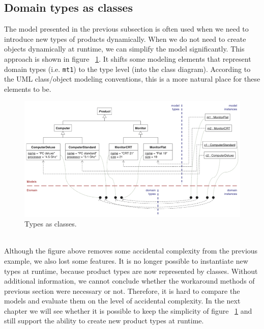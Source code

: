 \subsection{Domain types as classes}

The model presented in the previous subsection is often used when we need to introduce new types of products dynamically. When we do not need to create objects dynamically at runtime, we can simplify the model significantly. This approach is shown in figure ~\ref{fig:types_classes}. It shifts some modeling elements that represent domain types (i.e. \texttt{mt1}) to the type level (into the class diagram). According to the UML class/object modeling conventions, this is a more natural place for these elements to be.
\begin{figure}[h!]
\centering
\includegraphics[width=1.0\textwidth]{images/chap2_types_classes.png}
\caption{Types as classes.}
\label{fig:types_classes}
\end{figure} \\
Although the figure above removes some accidental complexity from the previous example, we also lost some features. It is no longer possible to instantiate new types at runtime, because product types are now represented by classes. Without additional information, we cannot conclude whether the workaround methods of previous section were necessary or not. Therefore, it is hard to compare the models and evaluate them on the level of accidental complexity. In the next chapter we will see whether it is possible to keep the simplicity of figure ~\ref{fig:types_classes} and still support the ability to create new product types at runtime.
